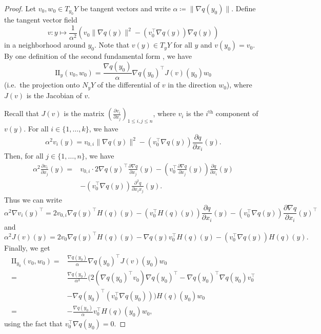 \begin{proof}
  Let $v_0, w_0 \in T_{y_0} Y$ be tangent vectors and write $\alpha \coloneq \| \nabla q(y_0) \|$. Define the tangent vector field
  \[
    v \colon y \mapsto \frac{1}{\alpha^2}\left(v_0 \| \nabla q(y) \|^2 - (v_0^\top \nabla q(y)) \nabla q(y)\right)
  \]
  in a neighborhood around $y_0$. Note that $v(y) \in T_y Y$ for all $y$ and $v(y_0) = v_0$. By one definition of the second fundamental form \cite[Chapter 8]{Lee1997}, we have 
  \[
    \text{II}_y(v_0, w_0) = \frac{\nabla q(y_0)}{\alpha} \nabla q(y_0)^\top J(v)(y_0) w_0
  \]
  (i.e.\ the projection onto $N_y Y$ of the differential of $v$ in the direction $w_0$), where $J(v)$ is the Jacobian of $v$.

  Recall that $J(v)$ is the matrix $(\frac{\partial v_i}{\partial x_j})_{1 \leq i, j \leq n}$, where $v_i$ is the $i^{\text{th}}$ component of $v(y)$. For all $i \in \{1, \ldots, k\}$, we have
  \[
    \alpha^2 v_i(y) = v_{0, i} \| \nabla q(y) \|^2 - (v_0^\top \nabla q(y)) \frac{\partial q}{\partial x_i}(y).
  \]
  Then, for all $j \in \{1, \ldots, n\}$, we have
  \begin{align*}
    \alpha^2 \frac{\partial v_i}{\partial x_j}(y) = {} & v_{0, i} \cdot 2 \nabla q(y)^\top \frac{\partial \nabla q}{\partial x_j}(y) - \left(v_0^\top \frac{\partial \nabla q}{\partial x_j}(y)\right) \frac{\partial q}{\partial x_i}(y) \\
    & - (v_0^\top \nabla q(y)) \frac{\partial^2 q}{\partial x_i x_j}(y).
  \end{align*}
  Thus we can write
  \[
    \alpha^2 \nabla v_i (y)^\top = 2 v_{0, i} \nabla q(y)^\top H(q)(y) - (v_0^\top H(q)(y)) \frac{\partial q}{\partial x_i}(y) - (v_0^\top \nabla q(y)) \frac{\partial \nabla q}{\partial x_i}(y)^\top
  \]
  and
  \[
    \alpha^2 J(v)(y) = 2 v_0 \nabla q(y)^\top H(q)(y) - \nabla q(y) v_0^\top H(q)(y) - (v_0^\top \nabla q(y)) H(q)(y).
  \]
  Finally, we get
  \begin{align*}
    \text{II}_{y_0}(v_0, w_0) = {} & \frac{\nabla q(y_0)}{\alpha} \nabla q(y_0)^\top J(v)(y_0) w_0 \\
    = {} & \frac{\nabla q(y_0)}{\alpha^3} \Big( 2(\nabla q(y_0)^\top v_0) \nabla q(y_0)^\top - \nabla q(y_0)^\top \nabla q(y_0) v_0^\top \\
    & - \nabla q(y_0)^\top (v_0^\top \nabla q(y_0)) \Big) H(q)(y_0) w_0 \\
    = {} & -\frac{\nabla q(y_0)}{\alpha} v_0^\top H(q)(y_0) w_0,
  \end{align*}
  using the fact that $v_0^\top \nabla q(y_0) = 0$.
\end{proof}

